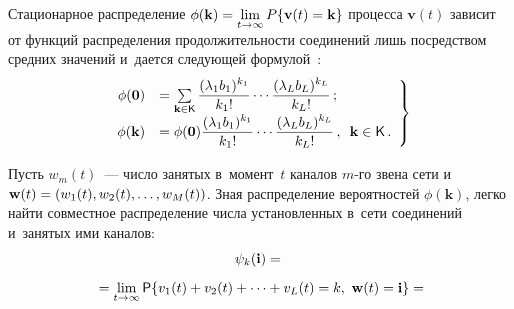 \begin{multicols}{2}
Стационарное распределение $\phi(\mathbf{k})\hm= 
\lim\limits_{t\to\infty} P\{ \mathbf{v}(t)=\mathbf{k}\}$ процесса $\mathbf{v}(t)$ зависит от функций 
распределения продолжительности соединений лишь посредством средних 
значений и~дается следующей формулой~\cite{7-n}:
  \begin{equation}
  \left.
  \begin{array}{rl}
  \phi(\mathbf{0}) &=  \sum\limits_{\mathbf{k}\in{\sf K}} \displaystyle\frac{\displaystyle (\lambda_1 
b_1)^{k_1}\mathstrut}{\displaystyle k_1!\mathstrut} \cdots \displaystyle\frac{\displaystyle (\lambda_L b_L)^{k_L}\mathstrut}{\displaystyle k_L!\mathstrut}\,;\\[6pt]
  \phi(\mathbf{k})& = \phi(\mathbf{0}) \displaystyle\frac{\displaystyle (\lambda_1 b_1)^{k_1}\mathstrut}{\displaystyle k_1!\mathstrut}\cdots 
\displaystyle\frac{\displaystyle (\lambda_L b_L)^{k_L}\mathstrut}{\displaystyle k_L!\mathstrut}\,,\enskip \mathbf{k}\in{\sf K}\,.
\end{array}
\right\}
  \label{e1-n}
  \end{equation}
  
  Пусть $w_m(t)$~--- число занятых в~момент~$t$ каналов $m$-го звена сети 
и~$\mathbf{w}(t)\hm= (w_1(t), w_2(t), \ldots , w_M(t))$. Зная распределение вероятностей 
$\phi(\mathbf{k})$, легко \mbox{найти} совместное распределение числа 
установленных в~сети соединений и~занятых ими каналов:
  \begin{multline*}
  \psi_k(\mathbf{i}) ={}\\[6pt]
  {}=\lim\limits_{t\to\infty} {\sf P} \{ v_1(t)+v_2(t)+\cdots +v_L(t)=k,\ 
\mathbf{w}(t)=\mathbf{i}\}={}\hspace*{-2.2pt}
\end{multline*}


\end{multicols}
